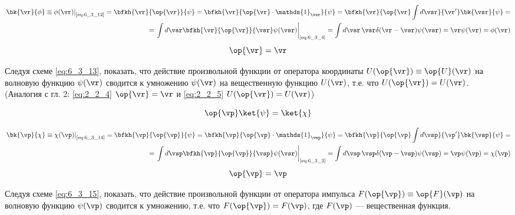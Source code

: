 \begin{equation}
\label{eq:6_3_13}
\begin{split}
	\left.\bk{\vr}{\phi} \equiv \phi(\vr)\right|_{\text{\eqref{eq:6_3_12}}} =
	\bfkh{\vr}{\op{\vr}}{\psi} = 
	\bfkh{\vr}{\op{\vr} \cdot \mathds{1}_{\vsr}}{\psi} =
	\bfkh{\vr}{\op{\vr}\int d\vsr}{\vr'} \bk{\vsr}{\psi} = \\ =
	\left.\int d\vsr \bfkh{\vr}{\op{\vr}}{\vsr} \psi(\vsr) \right|_{\text{\eqref{eq:6_3_4}}} =
	\int d\vsr \, \vsr \delta(\vr - \vsr) \psi(\vsr) = \vr \psi(\vr) = \phi(\vr)
\end{split}
\end{equation}
$$
\op{\vr}=\vr
$$

\begin{excr}
Следуя схеме \eqref{eq:6_3_13}, показать, что действие произвольной функции от оператора координаты $U(\op{\vr}) \equiv \op{U}(\vr)$ на волновую функцию $\psi(\vr)$ сводится к умножению $\psi(\vr)$ на вещественную функцию $U(\vr)$, т.е. что $U(\op{\vr})=U(\vr)$. \\
(Аналогия с  гл. 2: \eqref{eq:2_2_4} $\op{\vr}=\vr$  и \eqref{eq:2_2_5} $U(\op{\vr})=U(\vr)$)
\end{excr}

\begin{equation}
\label{eq:6_3_14}
\op{\vp} \ket{\psi} = \ket{\chi}
\end{equation}

\begin{equation}
\label{eq:6_3_15}
\begin{split}
	\left.\bk{\vp}{\chi} \equiv \chi(\vp)\right|_{\text{\eqref{eq:6_3_14}}} =
	\bfkh{\vp}{\op{\vp}}{\psi} = 
	\bfkh{\vp}{\op{\vp} \cdot \mathds{1}_{\vsp}}{\psi} =
	\bfkh{\vp}{\op{\vp}\int d\vsp}{\vp'} \bk{\vsp}{\psi} = \\ =
	\left.\int d\vsp \bfkh{\vp}{\op{\vp}}{\vsp} \psi(\vsr) \right|_{\text{\eqref{eq:6_3_3}}} =
	\int d\vsp \, \vsp \delta(\vp - \vsp) \psi(\vsp) = \vp \psi(\vp) = \chi(\vp)
\end{split}
\end{equation}
$$
\op{\vp}=\vp
$$

\begin{excr}
Следуя схеме \eqref{eq:6_3_15}, показать, что действие произвольной функции от оператора импульса $F(\op{\vp}) \equiv \op{F}(\vp)$ на волновую функцию $\psi(\vp)$ сводится к умножению, т.е. что $F(\op{\vp})=F(\vp)$, где $F(\vp)$ --- вещественная функция.
\end{excr}

